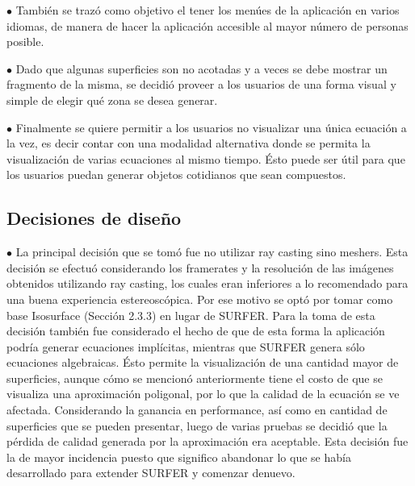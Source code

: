 \documentclass[12pt]{article}
\begin{document}
$\bullet$ También se trazó como objetivo el tener los menúes de la aplicación en varios idiomas, de manera de hacer la aplicación accesible al mayor número de personas posible.

$\bullet$ Dado que algunas superficies son no acotadas y a veces se debe mostrar un fragmento de la misma, se decidió proveer a los usuarios de una forma visual y simple de elegir qué zona se desea generar.

$\bullet$ Finalmente se quiere permitir a los usuarios no visualizar una única ecuación a la vez, es decir contar con una modalidad alternativa donde se permita la visualización de varias ecuaciones al mismo tiempo. Ésto puede ser útil para que los usuarios puedan generar objetos cotidianos que sean compuestos.

\subsection{Decisiones de diseño}

$\bullet$ La principal decisión que se tomó fue no utilizar ray casting sino meshers. Esta decisión se efectuó considerando los framerates y la resolución de las imágenes obtenidos utilizando ray casting, los cuales eran inferiores a lo recomendado para una buena experiencia estereoscópica. Por ese motivo se optó por tomar como base Isosurface (Sección 2.3.3) en lugar de SURFER. Para la toma de esta decisión también fue considerado el hecho de que de esta forma la aplicación podría generar ecuaciones implícitas, mientras que SURFER genera sólo ecuaciones algebraicas. Ésto permite la visualización de una cantidad mayor de superficies, aunque cómo se mencionó anteriormente tiene el costo de que se visualiza una aproximación poligonal, por lo que la calidad de la ecuación se ve afectada. Considerando la ganancia en performance, así como en cantidad de superficies que se pueden presentar, luego de varias pruebas se decidió que la pérdida de calidad generada por la aproximación era aceptable. Esta decisión fue la de mayor incidencia puesto que significo abandonar lo que se había desarrollado para extender SURFER y comenzar denuevo.
\end{document}
